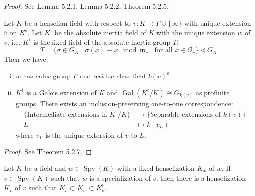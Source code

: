 \begin{proof}
See \cite{EP05} Lemma 5.2.1, Lemma 5.2.2, Theorem 5.2.5.
\end{proof}

\begin{theorem}\label{theorem-absoluteinertia}
Let $K$ be a henselian field with respect to $v: K\to\Gamma\cup\{\infty\}$ with unique extension $\overline{v}$ on $K^\text{s}$. Let $K^\text{t}$ be the absolute inertia field of $K$ with the unique extension $w$ of $v$, i.e. $K^\text{t}$ is the fixed field of the absolute inertia group $T$: 
\[ T = \{ \sigma\in G_K\mid \sigma(x)\equiv x\mod \mathfrak{m}_{\overline{v}} \quad \text{for all }x\in\mathcal{O}_{\overline{v}} \}\lhd G_K \]
Then we have:
\begin{enumerate}[(i)]
\item $w$ has value group $\Gamma$ and residue class field $k(v)^\text{s}$.
\item $K^\text{t}$ is a Galois extension of $K$ and $\operatorname{Gal}(K^\text{t}/K)\cong G_{k(v)}$ as profinite groups. There exists an inclusion-preserving one-to-one correspondence: 
\begin{align*}
\{ \text{Intermediate extensions in $K^\text{t}/K$} \} &\longrightarrow \{\text{Separable extensions of $k(v)$} \}\\ 
L &\longmapsto k(v_L)  
\end{align*}
where $v_L$ is the unique extension of $v$ to $L$.
\end{enumerate}
\end{theorem}

\begin{proof}
See \cite{EP05} Theorem 5.2.7.
\end{proof}

\begin{lemma}\label{lemma-henselization-specialization}
Let $K$ be a field and $w\in\operatorname{Spv}(K)$ with a fixed henselization $K_w$ of $w$. If $v\in\operatorname{Spv}(K)$ such that $w$ is a specialization of $v$, then there is a henselization $K_v$ of $v$ such that $K_v\subset K_w\subset K_v^\text{t}$.
\end{lemma}


